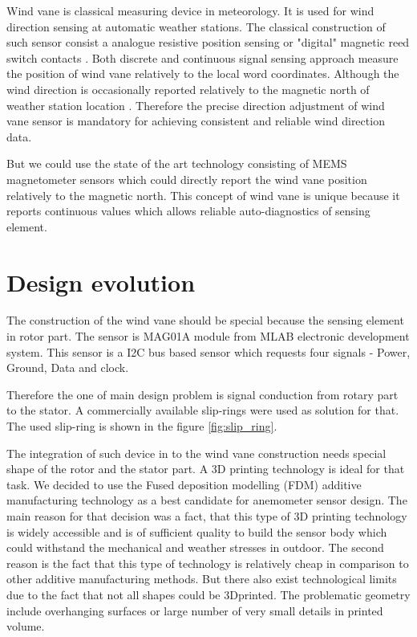 \documentclass{poster16}
\begin{document}
Wind vane is classical measuring device in meteorology. It is used for wind direction sensing at automatic weather stations. The classical construction of such sensor consist a analogue resistive position sensing or "digital" magnetic reed switch contacts \cite{wind_vane}. Both discrete and continuous signal sensing approach measure the position of wind vane relatively to the local word coordinates. Although the wind direction is occasionally reported relatively to the magnetic north of weather station location \cite{wind_direction}. Therefore the precise direction adjustment of wind vane sensor is mandatory for achieving consistent and reliable wind direction data.

But we could use the state of the art technology consisting of MEMS magnetometer sensors which could directly report the wind vane position relatively to the magnetic north. This concept of wind vane is unique because it reports continuous values which allows reliable auto-diagnostics of sensing element. 

\section{Design evolution}

The construction of the wind vane should be special because the sensing element in rotor part. The sensor is MAG01A module from MLAB electronic development system. This sensor is a I2C bus based sensor which requests four signals - Power, Ground, Data and clock. 

Therefore the one of main design problem is signal conduction from rotary part to the stator. A commercially available slip-rings were used as solution for that. 
The used slip-ring is shown in the figure \ref{fig:slip_ring}. 


The integration of such device in to the wind vane construction needs special shape of the rotor and the stator part. A 3D printing technology is ideal for that task. We decided to use the Fused deposition modelling (FDM) additive manufacturing technology as a best candidate for anemometer sensor design. The main reason for that decision was a fact, that this type of 3D printing technology is widely accessible and is of sufficient quality to build the sensor body which could withstand the mechanical and weather stresses in outdoor. The second reason is the fact that this type of technology is relatively  cheap in comparison to other additive manufacturing methods. 
But there also exist technological limits due to the fact that not all shapes could be 3Dprinted. The problematic geometry include overhanging surfaces or large number of very small details in printed volume. 
\end{document}
